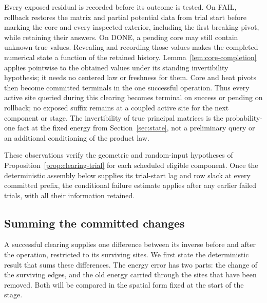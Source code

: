 Every exposed residual is recorded before its outcome is tested. On FAIL,
rollback restores the matrix and partial potential data from trial start
before marking the core and every inspected exterior, including the first
breaking pivot, while retaining their answers. On DONE, a pending core may still contain unknown true
values. Revealing and recording those values makes the completed numerical
state a function of the retained history. Lemma~\ref{lem:core-completion}
applies pointwise to the obtained values under its standing invertibility
hypothesis; it needs no centered law or freshness for them. Core and heat
pivots then become committed terminals in the one successful operation.
Thus every active site queried during this clearing becomes terminal on success or pending on
rollback; no exposed suffix remains at a coupled active site for the next
component or stage.
The invertibility of true principal matrices is the probability-one fact
at the fixed energy from Section~\ref{sec:state}, not a preliminary query or an additional
conditioning of the product law.

These observations verify the geometric and random-input hypotheses of
Proposition~\ref{prop:clearing-trial} for each scheduled eligible component.
Once the deterministic assembly below supplies its trial-start lag and row
slack at every committed prefix, the conditional failure estimate applies
after any earlier failed trials, with all their information retained.

\subsection{Summing the committed changes}

A successful clearing supplies one difference between its inverse before
and after the operation, restricted to its surviving sites. We first state the deterministic result that sums
these differences. The energy error has two parts: the change of the
surviving edges, and the old energy carried through the sites that have
been removed. Both will be compared in the spatial form fixed at the start
of the stage.

